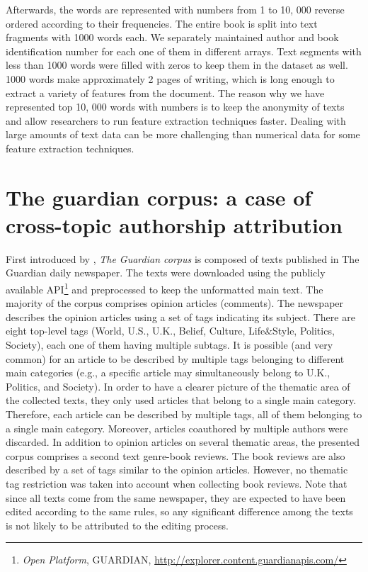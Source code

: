 Afterwards, the words are represented with numbers from 1 to 10, 000 reverse ordered according to their frequencies. The entire book is split into text fragments with 1000 words each. We separately maintained author and book identification number for each one of them in different arrays. Text segments with less than 1000 words were filled with zeros to keep them in the dataset as well.
1000 words make approximately 2 pages of writing, which is long enough to extract a variety of features from the document. The reason why we have represented top 10, 000 words with numbers is to keep the anonymity of texts and allow researchers to run feature extraction techniques faster. Dealing with large amounts of text data can be more challenging than numerical data for some feature extraction techniques.

\section{The guardian corpus: a case of cross-topic authorship attribution}

First introduced by \citeauthor{stamatatos2013robustness} \cite{stamatatos2013robustness}, \textit{The Guardian corpus} is composed of texts published in The Guardian daily newspaper. The texts were downloaded using the publicly available API\footnote{\textit{Open Platform}, GUARDIAN, \url{http://explorer.content.guardianapis.com/}} and preprocessed to keep the unformatted main text. The majority of the corpus comprises opinion articles
(comments). The newspaper describes the opinion articles using a set of tags indicating its subject. There are eight top-level tags (World, U.S., U.K., Belief, Culture, Life\&Style, Politics, Society), each one of them having multiple subtags. It is possible (and very common) for an article to be described by multiple tags belonging to different main categories (e.g., a specific article may simultaneously belong to U.K., Politics, and Society). In order to have a clearer picture of the thematic area of the collected texts, they only used articles that belong to a single main category. Therefore, each article can be described by multiple tags, all of them belonging to a single main category. Moreover, articles coauthored by multiple authors were discarded.
In addition to opinion articles on several thematic areas, the presented corpus comprises a second text genre-book reviews. The book reviews are also described by a set of tags similar to the opinion articles. However, no thematic tag restriction was taken into account when collecting book reviews. Note that since all texts come from the same newspaper, they are expected to have been edited according to the same rules, so any significant difference among the texts is not likely to be attributed to the editing process.

